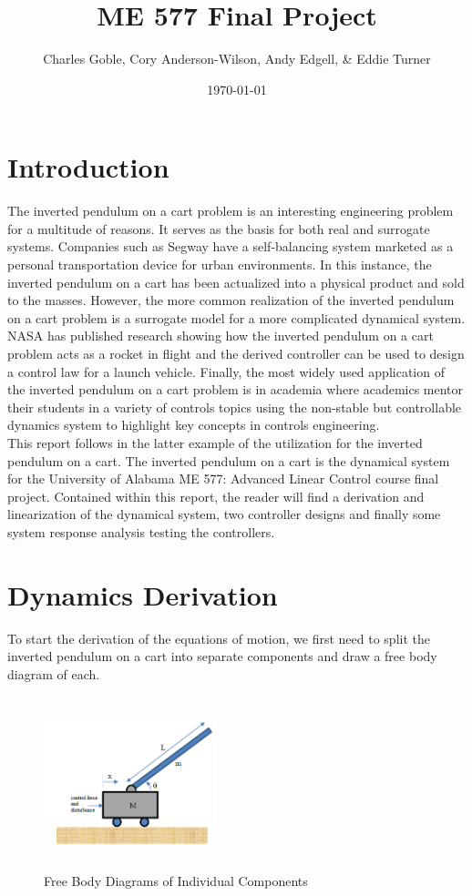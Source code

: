 \documentclass[titlepage]{article}
\title{ME 577 Final Project}
\author{Charles Goble, Cory Anderson-Wilson, Andy Edgell, \& Eddie Turner}
\date{\today}
\begin{document}
\maketitle
\tableofcontents

\newpage
\section{Introduction}
The inverted pendulum on a cart problem is an interesting engineering problem for a multitude of reasons. It serves as the basis for both real and surrogate systems. Companies such as Segway\texttrademark{} have a self-balancing system marketed as a personal transportation device for urban environments. In this instance, the inverted pendulum on a cart has been actualized into a physical product and sold to the masses. However, the more common realization of the inverted pendulum on a cart problem is a surrogate model for a more complicated dynamical system. NASA has published research showing how the inverted pendulum on a cart problem acts as a rocket in flight and the derived controller can be used to design a control law for a launch vehicle. Finally, the most widely used application of the inverted pendulum on a cart problem is in academia where academics mentor their students in a variety of controls topics using the non-stable but controllable dynamics system to highlight key concepts in controls engineering.\\

This report follows in the latter example of the utilization for the inverted pendulum on a cart. The inverted pendulum on a cart is the dynamical system for the University of Alabama ME 577: Advanced Linear Control course final project. Contained within this report, the reader will find a derivation and linearization of the dynamical system, two controller designs and finally some system response analysis testing the controllers.

\newpage
\section{Dynamics Derivation}
To start the derivation of the equations of motion, we first need to split the inverted pendulum on a cart into separate components and draw a free body diagram of each.

\begin{figure}[H]
\center
\includegraphics[width=5cm, height=5cm]{prompt_diagram.png}
\caption{Free Body Diagrams of Individual Components}
\end{figure}
\end{document}
